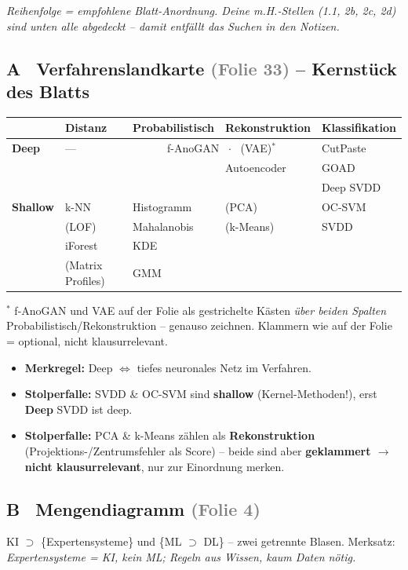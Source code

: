 \documentclass[10pt,a4paper]{article}
\newcommand{\stolper}{\textcolor{ampelrot}{\textbf{Stolperfalle:}} }
\newcommand{\folie}[1]{\textcolor{gray}{\footnotesize(#1)}}
\begin{document}
\emph{Reihenfolge = empfohlene Blatt-Anordnung. Deine m.H.-Stellen (1.1, 2b, 2c, 2d) sind unten alle abgedeckt -- damit entfällt das Suchen in den Notizen.}

\subsection*{A \ Verfahrenslandkarte \folie{Folie 33} -- Kernstück des Blatts}

\renewcommand{\arraystretch}{1.3}
\begin{center}
\begin{tabular}{|>{\bfseries}p{1.5cm}|p{2.9cm}|p{2.9cm}|p{2.9cm}|p{2.9cm}|}
\hline
 & \textbf{Distanz} & \textbf{Probabilistisch} & \textbf{Rekonstruktion} & \textbf{Klassifikation} \\
\hline
Deep & --- & \multicolumn{2}{c|}{f-AnoGAN \ $\cdot$ \ (VAE)$^{*}$} & CutPaste \\
 & & \multicolumn{1}{r}{} & Autoencoder & GOAD \\
 & & & & Deep SVDD \\
\hline
Shallow & k-NN & Histogramm & (PCA) & OC-SVM \\
 & (LOF) & Mahalanobis & (k-Means) & SVDD \\
 & iForest & KDE & & \\
 & (Matrix Profiles) & GMM & & \\
\hline
\end{tabular}
\end{center}
{\footnotesize $^{*}$ f-AnoGAN und VAE auf der Folie als gestrichelte Kästen \emph{über beiden Spalten} Probabilistisch/Rekonstruktion -- genauso zeichnen. Klammern wie auf der Folie = optional, nicht klausurrelevant.}

\begin{itemize}
  \item \textbf{Merkregel:} Deep $\Leftrightarrow$ tiefes neuronales Netz im Verfahren.
  \item \stolper SVDD \& OC-SVM sind \textbf{shallow} (Kernel-Methoden!), erst \textbf{Deep} SVDD ist deep.
  \item \stolper PCA \& k-Means zählen als \textbf{Rekonstruktion} (Projektions-/Zentrumsfehler als Score) -- beide sind aber \textbf{geklammert $\to$ nicht klausurrelevant}, nur zur Einordnung merken.
\end{itemize}

\subsection*{B \ Mengendiagramm \folie{Folie 4}}
KI $\supset$ \{Expertensysteme\} und \{ML $\supset$ DL\} -- zwei getrennte Blasen. Merksatz: \emph{Expertensysteme = KI, kein ML; Regeln aus Wissen, kaum Daten nötig.}
\end{document}
